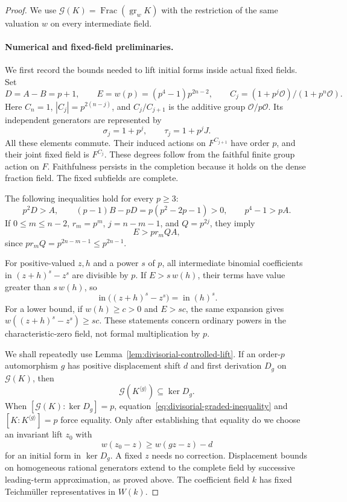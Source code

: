 \begin{proof}
We use $\mathcal G(K)=\operatorname{Frac}(\operatorname{gr}_wK)$ with the restriction of the same valuation $w$ on every intermediate field.

\paragraph{Numerical and fixed-field preliminaries.}
We first record the bounds needed to lift initial forms inside actual fixed fields. Set
\[
 D=A-B=p+1,\qquad E=w(p)=(p^4-1)p^{2n-2},
 \qquad C_j=(1+p^j\mathcal O)/(1+p^n\mathcal O).
\]
Here $C_n=1$, $|C_j|=p^{2(n-j)}$, and $C_j/C_{j+1}$ is the additive group $\mathcal O/p\mathcal O$. Its independent generators are represented by
\[
 \sigma_j=1+p^j,\qquad \tau_j=1+p^jJ.
\]
All these elements commute. Their induced actions on $F^{C_{j+1}}$ have order $p$, and their joint fixed field is $F^{C_j}$. These degrees follow from the faithful finite group action on $F$. Faithfulness persists in the completion because it holds on the dense fraction field. The fixed subfields are complete.

The following inequalities hold for every $p\ge3$:
\begin{equation}\label{eq:full-cartan-elementary}
 p^2D>A,\qquad
 (p-1)B-pD=p(p^2-2p-1)>0,\qquad p^4-1>pA.
\end{equation}
If $0\le m\le n-2$, $r_m=p^m$, $j=n-m-1$, and $Q=p^{2j}$, they imply
\begin{equation}\label{eq:full-cartan-power-bound}
 E>p r_m Q A,
\end{equation}
since $p r_m Q=p^{2n-m-1}\le p^{2n-1}$.

For positive-valued $z,h$ and a power $s$ of $p$, all intermediate binomial coefficients in $(z+h)^s-z^s$ are divisible by $p$. If $E>s\,w(h)$, their terms have value greater than $s\,w(h)$, so
\begin{equation}\label{eq:full-cartan-ordinary-power}
 \operatorname{in}\bigl((z+h)^s-z^s\bigr)
       =\operatorname{in}(h)^s.
\end{equation}
For a lower bound, if $w(h)\ge c>0$ and $E>sc$, the same expansion gives $w((z+h)^s-z^s)\ge sc$. These statements concern ordinary powers in the characteristic-zero field, not formal multiplication by $p$.

We shall repeatedly use Lemma~\ref{lem:divisorial-controlled-lift}. If an order-$p$ automorphism $g$ has positive displacement shift $d$ and first derivation $D_g$ on $\mathcal G(K)$, then
\[
 \mathcal G(K^{\langle g\rangle})\subseteq\ker D_g.
\]
When $[\mathcal G(K):\ker D_g]=p$, equation~\eqref{eq:divisorial-graded-inequality} and $[K:K^{\langle g\rangle}]=p$ force equality. Only after establishing that equality do we choose an invariant lift $z_0$ with
\begin{equation}\label{eq:full-cartan-control}
 w(z_0-z)\ge w(gz-z)-d
\end{equation}
for an initial form in $\ker D_g$. A fixed $z$ needs no correction. Displacement bounds on homogeneous rational generators extend to the complete field by successive leading-term approximation, as proved above. The coefficient field $k$ has fixed Teichm\"uller representatives in $W(k)$.


\end{proof}
